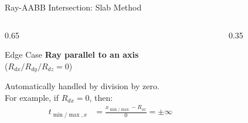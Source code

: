 \begin{frame}{Ray-AABB Intersection: Slab Method}
  \begin{columns}
    \begin{column}{0.65\textwidth}
      \begin{mathbox}{Edge Case}
        \small
        \textbf{Ray parallel to an axis} \\
        ($R_{dx} / R_{dy}/ R_{dz} = 0$) \\
        \vspace*{0.1cm}

        Automatically handled by division by zero. \\
        For example, if $R_{dx} = 0$, then:
        \begin{align*}
          t_{\min/\max,x} &= \frac{x_{\min/\max} - R_{ox}}{0} = \pm \infty
        \end{align*}
        \vspace*{-0.3cm}
      \end{mathbox}
    \end{column}
    \begin{column}{0.35\textwidth}
      \small
      \centering

\end{column}
\end{columns}
\end{frame}
